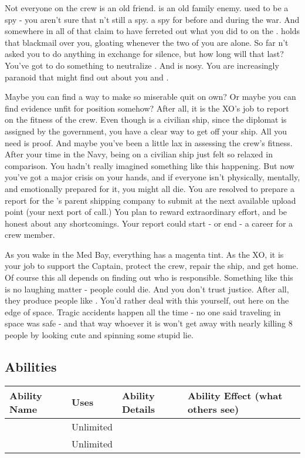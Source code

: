 \documentclass[char]{TMFHope}
\begin{document}
Not everyone on the crew is an old friend. \cDip{} is an old family enemy. \cDip{\They} used to be a spy - you aren't sure that \cDip{\they} \cDip{\are}n't still a spy. \cDip{\They} \cDip{\were} a spy for \pPlan{} before and during the war. And somewhere in all of that \cDip{\they} claim\cDip{\plural} to have ferreted out what you did to \cCap{} on the \pOld{}. \cDip{} holds that blackmail over you, gloating whenever the two of you are alone. So far \cDip{\they} \cDip{\have}n't asked you to do anything in exchange for \cDip{\their} silence, but how long will that last? You've got to do something to neutralize \cDip{\them}. And \cDip{} is nosy. You are increasingly paranoid that \cDip{\they} might find out about you and \cSci{}.

Maybe you can find a way to make \cDip{} so miserable \cDip{\they} quit on \cDip{\their} own? Or maybe you can find evidence \cDip{\they} \cDip{\are} unfit for \cDip{\their} position somehow? After all, it is the XO's job to report on the fitness of the crew. Even though \pNew{} is a civilian ship, since the diplomat is assigned by the government, you have a clear way to get  off your ship. All you need is proof. And maybe you've been a little lax in assessing the crew's fitness. After your time in the Navy, being on a civilian ship just felt so relaxed in comparison. You hadn't really imagined something like this happening. But now you've got a major crisis on your hands, and if everyone isn't physically, mentally, and emotionally prepared for it, you might all die. You are resolved to prepare a report for the \pNew{}'s parent shipping company to submit at the next available upload point (your next port of call.) You plan to reward extraordinary effort, and be honest about any shortcomings. Your report could start - or end - a career for a crew member.

As you wake in the Med Bay, everything has a magenta tint.  As the XO, it is your job to support the Captain, protect the crew, repair the ship, and get home. Of course this all depends on finding out who is responsible. Something like this is no laughing matter - people could die. And you don't trust \pPlan{} justice. After all, they produce people like \cDip{}. You'd rather deal with this yourself, out here on the edge of space. Tragic accidents happen all the time - no one said traveling in space was safe - and that way whoever it is won't get away with nearly killing 8 people by looking cute and spinning some stupid lie.

\subsection*{Abilities}
\begin{tabular}{|p{3cm}|p{1.5cm}|p{8cm}|p{3.5cm}|} 
 \hline
 \textbf{Ability Name} & \textbf{Uses} & \textbf{Ability Details} & \textbf{Ability Effect (what others see)} \\ 
\hline 
\aThreat{\MYname} & Unlimited & \aThreat{\MYtext} & \aThreat{\MYeffect} \\ 
 \hline
	\aPractice{\MYname} & Unlimited & \aPractice{\MYtext} & \aPractice{\MYeffect} \\ 
\hline
\end{tabular}
\end{document}
